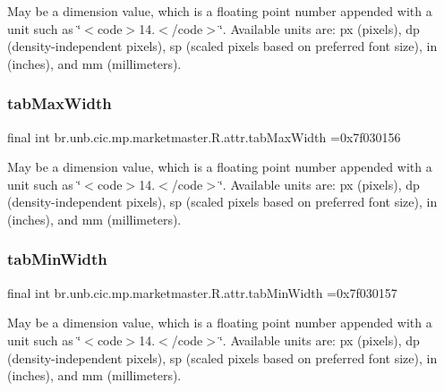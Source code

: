 May be a dimension value, which is a floating point number appended with a unit such as \char`\"{}$<$code$>$14.\+5sp$<$/code$>$\char`\"{}. Available units are\+: px (pixels), dp (density-\/independent pixels), sp (scaled pixels based on preferred font size), in (inches), and mm (millimeters). \mbox{\label{classbr_1_1unb_1_1cic_1_1mp_1_1marketmaster_1_1R_1_1attr_a4ae00e1a7cd6983ffa208533ffb17cd7}} 
\subsubsection{\texorpdfstring{tab\+Max\+Width}{tabMaxWidth}}
{\footnotesize\ttfamily final int br.\+unb.\+cic.\+mp.\+marketmaster.\+R.\+attr.\+tab\+Max\+Width =0x7f030156\hspace{0.3cm}{\ttfamily [static]}}

May be a dimension value, which is a floating point number appended with a unit such as \char`\"{}$<$code$>$14.\+5sp$<$/code$>$\char`\"{}. Available units are\+: px (pixels), dp (density-\/independent pixels), sp (scaled pixels based on preferred font size), in (inches), and mm (millimeters). \mbox{\label{classbr_1_1unb_1_1cic_1_1mp_1_1marketmaster_1_1R_1_1attr_a06bd442b768e86f3c18b54b87e99c963}} 
\subsubsection{\texorpdfstring{tab\+Min\+Width}{tabMinWidth}}
{\footnotesize\ttfamily final int br.\+unb.\+cic.\+mp.\+marketmaster.\+R.\+attr.\+tab\+Min\+Width =0x7f030157\hspace{0.3cm}{\ttfamily [static]}}

May be a dimension value, which is a floating point number appended with a unit such as \char`\"{}$<$code$>$14.\+5sp$<$/code$>$\char`\"{}. Available units are\+: px (pixels), dp (density-\/independent pixels), sp (scaled pixels based on preferred font size), in (inches), and mm (millimeters). \mbox{\label{classbr_1_1unb_1_1cic_1_1mp_1_1marketmaster_1_1R_1_1attr_a05a800a0b6ca1e387e4b7ba8598ebf89}} 
